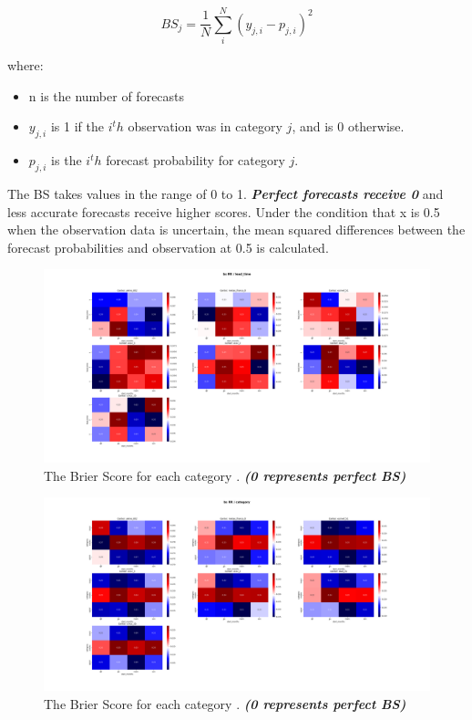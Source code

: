 $$BS_j=\frac{1}{N} \sum\limits_{i}^{N} (y_{j,i} - p_{j,i})^2$$

where:
\begin{itemize}
	\item n is the number of forecasts
	\item $y_{j,i} $ is 1 if the $i^th$ observation was in category $j$, and is 0 otherwise.
	\item $p_{j,i}$  is the $i^th$ forecast probability for category $j$.
\end{itemize}
The BS takes values in the range of 0 to 1. \textbf{\textit{Perfect forecasts receive 0}} and less accurate forecasts receive higher scores. Under the condition that x is 0.5 when the observation data is uncertain, the mean squared differences between the forecast probabilities and observation at 0.5 is calculated.


\begin{figure}[H]
    \centering
    \includegraphics[scale=0.3]{bs_RR_lead_time.png}
    \caption{The Brier Score for each category  . \textbf{\textit{(0 represents perfect BS)}}}
\end{figure}

\begin{figure}[H]
    \centering
    \includegraphics[scale=0.3]{bs_RR_category.png}
    \caption{The Brier Score for each category  . \textbf{\textit{(0 represents perfect BS)}}}
\end{figure}

